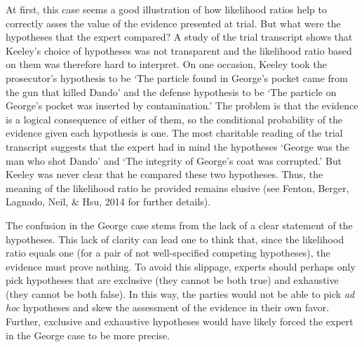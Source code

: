\documentclass[
  10pt,
  dvipsnames,enabledeprecatedfontcommands]{scrartcl}
\begin{document}
At first, this case seems a good illustration of how likelihood ratios
help to correctly asses the value of the evidence presented at trial.
But what were the hypotheses that the expert compared? A study of the
trial transcript shows that Keeley's choice of hypotheses was not
transparent and the likelihood ratio based on them was therefore hard to
interpret. On one occasion, Keeley took the prosecutor's hypothesis to
be `The particle found in George's pocket came from the gun that killed
Dando' and the defense hypothesis to be `The particle on George's pocket
was inserted by contamination.' The problem is that the evidence is a
logical consequence of either of them, so the conditional probability of
the evidence given each hypothesis is one. The most charitable reading
of the trial transcript suggests that the expert had in mind the
hypotheses `George was the man who shot Dando' and `The integrity of
George's coat was corrupted.' But Keeley was never clear that he
compared these two hypotheses. Thus, the meaning of the likelihood ratio
he provided remains elusive (see Fenton, Berger, Lagnado, Neil, \& Hsu,
2014 for further details).

The confusion in the George case stems from the lack of a clear
statement of the hypotheses. This lack of clarity can lead one to think
that, since the likelihood ratio equals one (for a pair of not
well-specified competing hypotheses), the evidence must prove nothing.
To avoid this slippage, experts should perhaps only pick hypotheses that
are exclusive (they cannot be both true) and exhaustive (they cannot be
both false). In this way, the parties would not be able to pick
\textit{ad hoc} hypotheses and skew the assessment of the evidence in
their own favor. Further, exclusive and exhaustive hypotheses would have
likely forced the expert in the George case to be more precise.
\end{document}
